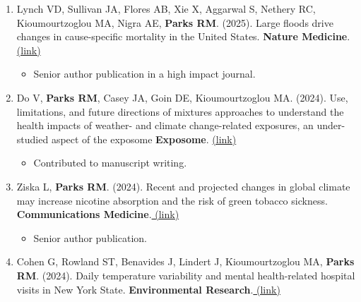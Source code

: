 \begin{enumerate}

    \item \noindent Lynch VD, Sullivan JA, Flores AB, Xie X, Aggarwal S, Nethery RC, Kioumourtzoglou MA, Nigra AE, \textbf{Parks RM}. (2025). Large floods drive changes in cause-specific mortality in the United States. \textbf{Nature Medicine}.\href{https://www.nature.com/articles/s41591-024-03358-z}{ (link)}

    \begin{itemize}
        \item Senior author publication in a high impact journal.
    \end{itemize}

     \item \noindent Do V, \textbf{Parks RM}, Casey JA,  Goin DE, Kioumourtzoglou MA. (2024). Use, limitations, and future directions of mixtures approaches to understand the health impacts of weather- and climate change-related exposures, an under-studied aspect of the exposome \textbf{Exposome}. \href{https://academic.oup.com/exposome/advance-article/doi/10.1093/exposome/osae007/7824058}{(link)}

    \begin{itemize}
        \item Contributed to manuscript writing.
    \end{itemize}

    \item \noindent Ziska L, \textbf{Parks RM}. (2024). Recent and projected changes in global climate may increase nicotine absorption and the risk of green tobacco sickness. \textbf{Communications Medicine}.\href{https://www.nature.com/articles/s43856-024-00584-x}{ (link)}

    \begin{itemize}
        \item Senior author publication.
    \end{itemize}
    
    \item \noindent Cohen G, Rowland ST, Benavides J, Lindert J, Kioumourtzoglou MA, \textbf{Parks RM}. (2024). Daily temperature variability and mental health-related hospital visits in New York State. \textbf{Environmental Research}.\href{https://www.sciencedirect.com/science/article/abs/pii/S0013935124011435}{ (link)}
    

\end{enumerate}
